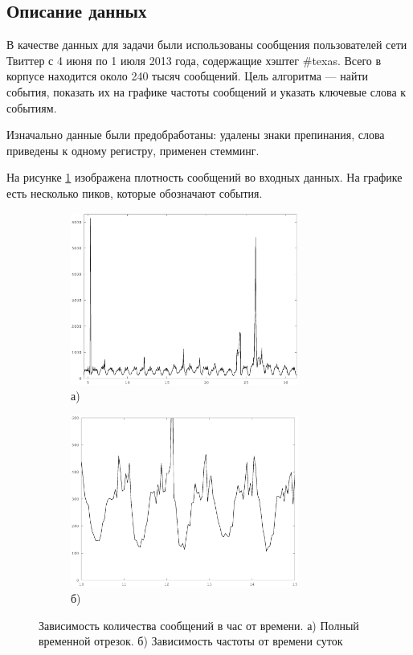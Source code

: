 \documentclass[12pt, a4paper]{article}
\begin{document}
  \subsection{Описание данных}
  В качестве данных для задачи были использованы сообщения пользователей сети Твиттер с 4 июня по 1 июля 2013 года, содержащие хэштег \#texas. Всего в корпусе находится около 240 тысяч сообщений. Цель алгоритма --- найти события, показать их на графике частоты сообщений и указать ключевые слова к событиям.
  
  Изначально данные были предобработаны: удалены знаки препинания, слова приведены к одному регистру, применен стемминг.
  
  На рисунке \ref{fig:all-freq} изображена плотность сообщений во входных данных. На графике есть несколько пиков, которые обозначают события. 
  \begin{figure}[H]
  \centering
  \begin{subfigure}[b]{0.45 \textwidth}
	  \centering
	  \includegraphics[width=7.5cm]{all-freq.eps}
	  \caption*{а)}
  \end{subfigure}
  \begin{subfigure}[b]{0.45 \textwidth}
	  \centering
	  \includegraphics[width=7.5cm]{all-freq-scaled.eps}
	  \caption*{б)}
  \end{subfigure}  
  \caption{Зависимость количества сообщений в час от времени. а) Полный временной отрезок. б) Зависимость частоты от времени суток}
  \label{fig:all-freq}
  \end{figure}
  
\end{document}
